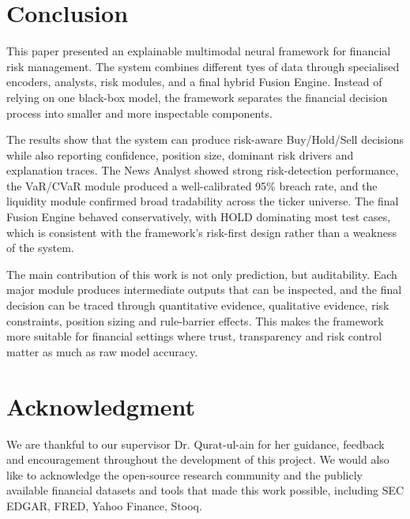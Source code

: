 \documentclass[conference]{IEEEtran}
\begin{document}
\section{Conclusion}

This paper presented an explainable multimodal neural framework for financial risk management. The system combines different tyes of data through specialised encoders, analysts, risk modules, and a final hybrid Fusion Engine. Instead of relying on one black-box model, the framework separates the financial decision process into smaller and more inspectable components.

The results show that the system can produce risk-aware Buy/Hold/Sell decisions while also reporting confidence, position size, dominant risk drivers and explanation traces. The News Analyst showed strong risk-detection performance, the VaR/CVaR module produced a well-calibrated 95\% breach rate, and the liquidity module confirmed broad tradability across the ticker universe. The final Fusion Engine behaved conservatively, with HOLD dominating most test cases, which is consistent with the framework's risk-first design rather than a weakness of the system.

The main contribution of this work is not only prediction, but auditability. Each major module produces intermediate outputs that can be inspected, and the final decision can be traced through quantitative evidence, qualitative evidence, risk constraints, position sizing and rule-barrier effects. This makes the framework more suitable for financial settings where trust, transparency and risk control matter as much as raw model accuracy.
    
\section*{Acknowledgment}
We are thankful to our supervisor Dr. Qurat-ul-ain for her guidance, feedback and encouragement throughout the development of this project. We would also like to acknowledge the open-source research community and the publicly available financial datasets and tools that made this work possible, including SEC EDGAR, FRED, Yahoo Finance, Stooq. 

\end{document}
